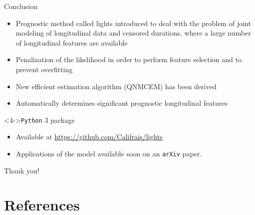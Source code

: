 \documentclass{beamer}
\begin{document}
\begin{frame}{Conclusion}

\begin{itemize}
  \item<1-> Prognostic method called lights introduced to deal with the problem of joint modeling of longitudinal data and censored durations, where a large number of longitudinal features are available
  \item<2-> Penalization of the likelihood in order to perform feature selection and to prevent overfitting
  \item<3-> New efficient estimation algorithm (QNMCEM) has been derived
  \item<4-> Automatically determines significant prognostic longitudinal features
\end{itemize}

\begin{block}<4->{\texttt{Python} 3 package}
\begin{itemize}
  \item<4-> Available at \small{\url{https://github.com/Califrais/lights}}
  \item<5-> Applications of the model available soon on an \texttt{arXiv} paper.
\end{itemize}
\end{block}

\end{frame}

\begin{frame}[noframenumbering]
\Large \centering
\textcolor{blue_pres}{} Thank you!
\end{frame}

\section{References}
\end{document}
